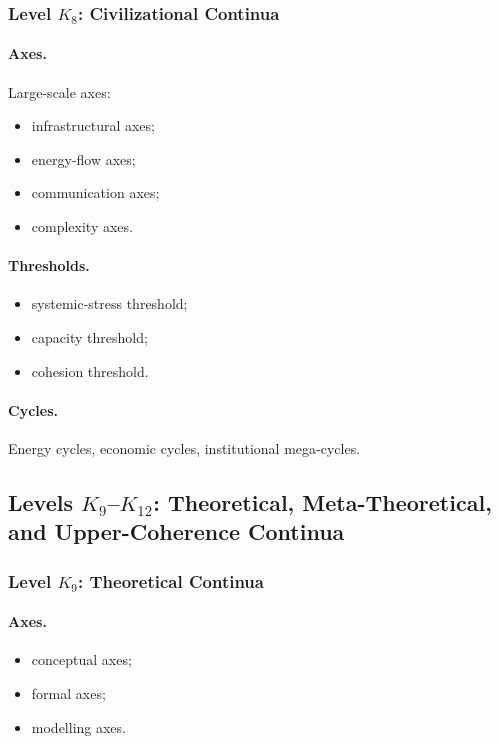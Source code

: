 \subsubsection{Level \texorpdfstring{\(K_8\)}{K8}: Civilizational Continua}

\paragraph{Axes.}
Large-scale axes:
\begin{itemize}
    \item infrastructural axes;
    \item energy-flow axes;
    \item communication axes;
    \item complexity axes.
\end{itemize}

\paragraph{Thresholds.}
\begin{itemize}
    \item systemic-stress threshold;
    \item capacity threshold;
    \item cohesion threshold.
\end{itemize}

\paragraph{Cycles.}
Energy cycles, economic cycles, institutional mega-cycles.


\subsection{Levels \texorpdfstring{\texorpdfstring{$K_9$}{K\_9}–$K_{12}$}{K9–K12}: Theoretical, Meta-Theoretical, and Upper-Coherence Continua}

\subsubsection{Level \texorpdfstring{\(K_9\)}{K9}: Theoretical Continua}

\paragraph{Axes.}
\begin{itemize}
    \item conceptual axes;
    \item formal axes;
    \item modelling axes.
\end{itemize}

